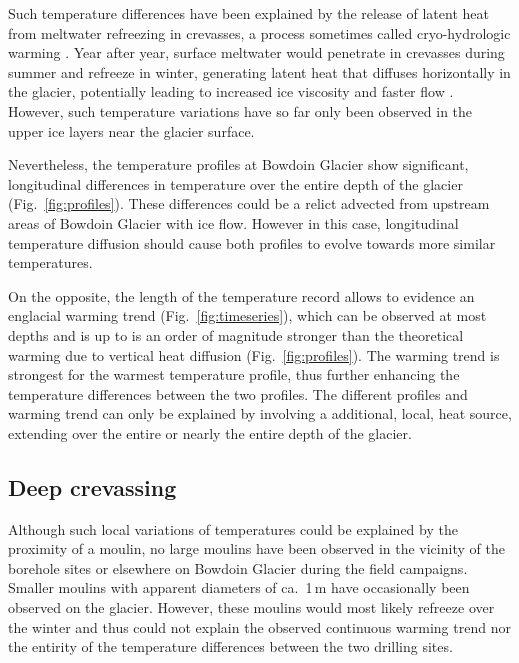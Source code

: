 \documentclass[utf8]{article}
\begin{document}
    Such temperature differences have been explained by the release of latent
    heat from meltwater refreezing in crevasses, a process sometimes called
    cryo-hydrologic warming \citep{Phillips.etal.2010}. Year after year,
    surface meltwater would penetrate in crevasses during summer and refreeze
    in winter, generating latent heat that diffuses horizontally in the
    glacier, potentially leading to increased ice viscosity and faster flow
    \citep{Phillips.etal.2013}.  However, such temperature variations have so
    far only been observed in the upper ice layers near the glacier surface.

    Nevertheless, the temperature profiles at Bowdoin Glacier show significant,
    longitudinal differences in temperature over the entire depth of the
    glacier (Fig.~\ref{fig:profiles}). These differences could be a relict
    advected from upstream areas
    of Bowdoin Glacier with ice flow. However in this case, longitudinal
    temperature diffusion should cause both profiles to evolve towards more
    similar temperatures.

    On the opposite, the length of the temperature record allows to evidence an
    englacial warming trend (Fig.~\ref{fig:timeseries}), which can be observed
    at most depths and is up to is an order of magnitude stronger than the
    theoretical warming due to vertical heat diffusion
    (Fig.~\ref{fig:profiles}). The warming trend is strongest for the warmest
    temperature profile, thus further enhancing the temperature differences
    between the two profiles. The different profiles and warming trend can only
    be explained by involving a additional, local, heat source, extending over
    the entire or nearly the entire depth of the glacier.


\subsection{Deep crevassing}

    Although such local variations of temperatures could be explained by the
    proximity of a moulin, no large moulins have been observed in the vicinity
    of the borehole sites or elsewhere on Bowdoin Glacier during the field
    campaigns. Smaller moulins with apparent diameters of ca.~1\,m have
    occasionally been observed on the glacier. However, these moulins would
    most likely refreeze over the winter and thus could not explain the
    observed continuous warming trend nor the entirity of the temperature
    differences between the two drilling sites.
\end{document}
